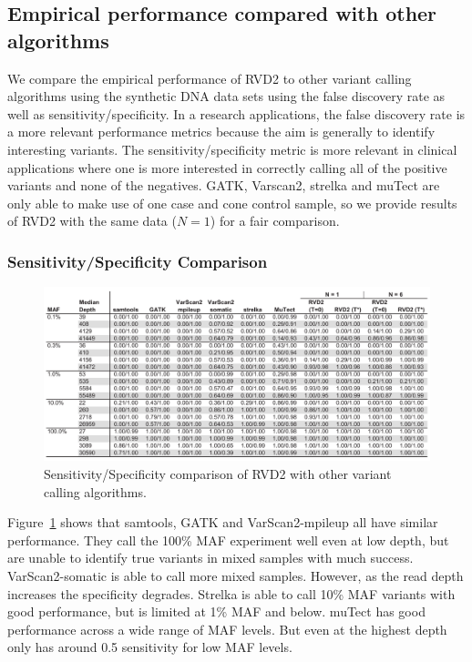 \documentclass[11pt,reqno]{amsart}
\begin{document}
\subsection{Empirical performance compared with other algorithms}\label{sec:comparison}

We compare the empirical performance of RVD2 to other variant calling algorithms using the synthetic DNA data sets using the false discovery rate as well as sensitivity/specificity. In a research applications, the false discovery rate is a more relevant performance metrics because the aim is generally to identify interesting variants. The sensitivity/specificity metric is more relevant in clinical applications where one is more interested in correctly calling all of the positive variants and none of the negatives. GATK, Varscan2, strelka and muTect are only able to make use of one case and cone control sample, so we provide results of RVD2 with the same data ($N=1$) for a fair comparison.


\subsubsection*{Sensitivity/Specificity Comparison}

\begin{figure}[h]
\begin{center}
\includegraphics[width=160mm]{pdf_figs/comparison_table_ss.pdf}
\caption{Sensitivity/Specificity comparison of RVD2 with other variant calling algorithms.}
\label{tbl:comparison_ss}
\end{center}
\end{figure}

Figure~\ref{tbl:comparison_ss} shows that samtools, GATK and VarScan2-mpileup all have similar performance. They call the 100\% MAF experiment well even at low depth, but are unable to identify true variants in mixed samples with much success. VarScan2-somatic is able to call more mixed samples. However, as the read depth increases the specificity degrades. Strelka is able to call 10\% MAF variants with good performance, but is limited at 1\% MAF and below. muTect has good performance across a wide range of MAF levels. But even at the highest depth only has around 0.5 sensitivity for low MAF levels.
\end{document}
